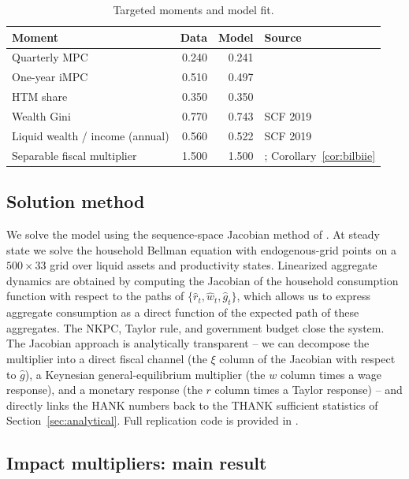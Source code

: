 \begin{table}[ht]
\centering\small
\caption{Targeted moments and model fit.}
\label{tab:moments}
\begin{tabular}{@{}lrrp{4.2cm}@{}}
\toprule
Moment & {Data} & {Model} & Source \\
\midrule
Quarterly MPC & 0.240 & 0.241 & \citet{Fagereng2021} \\
One-year iMPC & 0.510 & 0.497 & \citet{Fagereng2021} \\
HTM share & 0.350 & 0.350 & \citet{KaplanViolante2014} \\
Wealth Gini & 0.770 & 0.743 & SCF 2019 \\
Liquid wealth / income (annual) & 0.560 & 0.522 & SCF 2019 \\
Separable fiscal multiplier & 1.500 & 1.500 & \citet{Bilbiie2025}; Corollary~\ref{cor:bilbiie} \\
\bottomrule
\end{tabular}
\end{table}

\subsection{Solution method}\label{subsec:solution}
We solve the model using the sequence-space Jacobian method of
\citet{AuclertBardoczy2021}. At steady state we solve the household Bellman
equation with endogenous-grid points on a $500\times 33$ grid over liquid
assets and productivity states. Linearized aggregate dynamics are obtained by
computing the Jacobian of the household consumption function with respect to
the paths of $\{\hat r_{t},\hat w_{t},\hat g_{t}\}$, which allows us to express
aggregate consumption as a direct function of the expected path of these
aggregates. The NKPC, Taylor rule, and government budget close the system. The
Jacobian approach is analytically transparent -- we can decompose the multiplier
into a direct fiscal channel (the $\xi$ column of the Jacobian with respect to
$\hat g$), a Keynesian general-equilibrium multiplier (the $w$ column times a
wage response), and a monetary response (the $r$ column times a Taylor response)
-- and directly links the HANK numbers back to the THANK sufficient statistics
of Section~\ref{sec:analytical}. Full replication code is provided in
.

\subsection{Impact multipliers: main result}\label{subsec:main-result}

